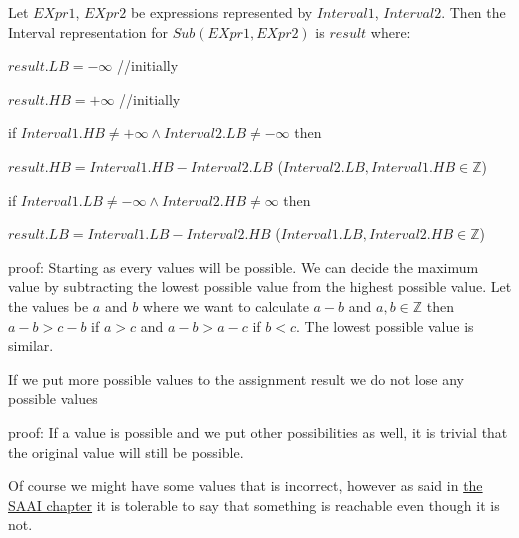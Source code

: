 \begin{theorem}
	Let $EXpr1$, $EXpr2$ be expressions represented by $Interval1$, $Interval2$. Then the Interval representation for $Sub(EXpr1, EXpr2)$ is $result$ where:
	
	$result.LB=-\infty$ //initially
	
	$result.HB=+\infty$ //initially
	
	if $Interval1.HB \neq +\infty \land Interval2.LB \neq -\infty$ then 
	
	$result.HB=Interval1.HB-Interval2.LB$ ($Interval2.LB, Interval1.HB \in \mathbb{Z}$)
	
	if $Interval1.LB \neq -\infty \land Interval2.HB \neq \infty$ then 
	
	$result.LB=Interval1.LB-Interval2.HB$ ($Interval1.LB, Interval2.HB \in \mathbb{Z}$)
	
\end{theorem}
{proof: } Starting as every values will be possible. We can decide the maximum value by subtracting the lowest possible value from the highest possible value. Let the values be $a$ and $b$ where we want to calculate $a-b$ and $a, b \in \mathbb{Z}$ then $a-b>c-b$ if $a>c$ and $a-b>a-c$ if $b<c$. The lowest possible value is similar.


\begin{theorem}
	If we put more possible values to the assignment result we do not lose any possible values	
\end{theorem}
{proof: }If a value is possible and we put other possibilities as well, it is trivial that the original value will still be possible.

 Of course we might have some values that is incorrect, however as said in \hyperref[sec:partition]{the SAAI chapter} it is tolerable to say that something is reachable even though it is not. 

